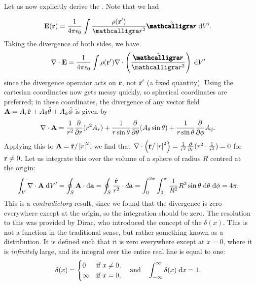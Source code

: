 Let us now explicitly derive the . Note that we had

\begin{align}
    \bv{E}(\bv{r}) = \frac{1}{4 \pi \epsilon_{0}} \int \frac{\rho(\bv{r}')}{\curs{r}^{2}} \hat{\bcurs{r}} \; \di{V}'.
\end{align}
Taking the divergence of both sides, we have
\begin{align}
    \nabla \cdot \bv{E} = \frac{1}{4 \pi \epsilon_{0}} \int \rho(\bv{r}') \nabla \cdot \left( \frac{\hat{\bcurs{r}}}{\curs{r}^{2}} \right) \; \di{V}'
\end{align}
since the divergence operator acts on $\mathbf{r}$, not $\mathbf{r}'$ (a fixed quantity). Using the cartesian coordinates now gets messy quickly, so spherical coordinates are preferred; in these coordinates, the divergence of any vector field $\mathbf{A} = A_{r} \hat{\mathbf{r}} + A_{\theta} \hat{\mathbf{\theta}} + A_{\phi} \hat{\mathbf{\phi}}$ is given by
\begin{align}
    \nabla \cdot \mathbf{A} = \frac{1}{r^{2}} \frac{\partial}{\partial r} (r^{2} A_{r}) + \frac{1}{r \sin \theta} \frac{\partial}{\partial \theta} (A_{\theta} \sin \theta) + \frac{1}{r \sin \theta} \frac{\partial}{\partial \phi} A_{\phi}.
\end{align}
Applying this to $\mathbf{A} = \hat{\mathbf{r}} / \left| r \right|^{2}$, we find that $\nabla \cdot \left( \hat{\mathbf{r}} / \left| r \right|^{2} \right) = \frac{1}{r^{2}} \frac{\partial}{\partial r} (r^{2} \cdot \frac{1}{r^{2}}) = 0$ for $\mathbf{r} \neq 0$. Let us integrate this over the volume of a sphere of radius $R$ centred at the origin:
\begin{align}
    \int_{V} \nabla \cdot \mathbf{A} \; \mathrm{d}V' = \oint_{S} \mathbf{A} \cdot \mathrm{d}\mathbf{a} = \oint_{S} \frac{\hat{\mathbf{r}}}{r^{2}} \cdot d \mathbf{a} = \int_{0}^{2\pi} \int_{0}^{\pi} \frac{1}{R^{2}} R^{2} \sin \theta \; \mathrm{d}\theta \; \mathrm{d}\phi = 4\pi.
\end{align}
This is a \textit{contradictory} result, since we found that the divergence is zero everywhere except at the origin, so the integration should be zero. The resolution to this was provided by Dirac, who introduced the concept of the  $\delta(x)$. This is not a function in the traditional sense, but rather something known as a distribution. It is defined such that it is zero everywhere except at $x = 0$, where it is \textit{infinitely} large, and its integral over the entire real line is equal to one:
\begin{align}
    \delta(x) = \begin{cases}
        0 &\text{if } x \neq 0, \\
        \infty &\text{if } x = 0,
    \end{cases} \quad \text{and} \quad \int_{-\infty}^{\infty} \delta(x) \; \mathrm{d}x = 1.
\end{align}
